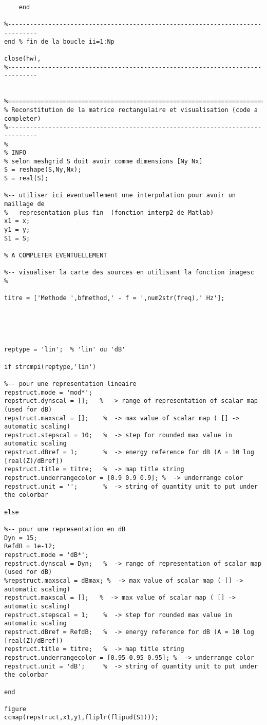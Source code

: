 \begin{verbatim}
    end    
    
%------------------------------------------------------------------------------
end % fin de la boucle ii=1:Np

close(hw),
%------------------------------------------------------------------------------


%==============================================================================
% Reconstitution de la matrice rectangulaire et visualisation (code a completer) 
%------------------------------------------------------------------------------
%
% INFO
% selon meshgrid S doit avoir comme dimensions [Ny Nx]
S = reshape(S,Ny,Nx);
S = real(S);

%-- utiliser ici eventuellement une interpolation pour avoir un maillage de 
%   representation plus fin  (fonction interp2 de Matlab)
x1 = x;
y1 = y;
S1 = S;

% A COMPLETER EVENTUELLEMENT

%-- visualiser la carte des sources en utilisant la fonction imagesc
%

titre = ['Methode ',bfmethod,' - f = ',num2str(freq),' Hz'];





reptype = 'lin';  % 'lin' ou 'dB'

if strcmpi(reptype,'lin')
    
%-- pour une representation lineaire
repstruct.mode = 'mod*';
repstruct.dynscal = [];   %  -> range of representation of scalar map (used for dB)
repstruct.maxscal = [];    %  -> max value of scalar map ( [] -> automatic scaling)
repstruct.stepscal = 10;   %  -> step for rounded max value in automatic scaling
repstruct.dBref = 1;       %  -> energy reference for dB (A = 10 log [real(Z)/dBref])
repstruct.title = titre;   %  -> map title string
repstruct.underrangecolor = [0.9 0.9 0.9]; %  -> underrange color
repstruct.unit = '';       %  -> string of quantity unit to put under the colorbar

else
    
%-- pour une representation en dB
Dyn = 15;
RefdB = 1e-12;
repstruct.mode = 'dB*';
repstruct.dynscal = Dyn;   %  -> range of representation of scalar map (used for dB)
%repstruct.maxscal = dBmax; %  -> max value of scalar map ( [] -> automatic scaling)
repstruct.maxscal = [];   %  -> max value of scalar map ( [] -> automatic scaling)
repstruct.stepscal = 1;    %  -> step for rounded max value in automatic scaling
repstruct.dBref = RefdB;   %  -> energy reference for dB (A = 10 log [real(Z)/dBref])
repstruct.title = titre;   %  -> map title string
repstruct.underrangecolor = [0.95 0.95 0.95]; %  -> underrange color
repstruct.unit = 'dB';     %  -> string of quantity unit to put under the colorbar

end

figure
ccmap(repstruct,x1,y1,fliplr(flipud(S1)));



\end{verbatim}
